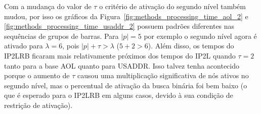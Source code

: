 Com a mudança do valor de $\tau$ o critério de ativação do segundo nível também mudou, por isso os gráficos da Figura~\ref{fig:methods_processing_time_aol_2} e \ref{fig:methods_processing_time_usaddr_2} possuem padrões diferentes nas sequências de grupos de barras. Para $|p|=5$ por exemplo o segundo nível agora é ativado para $\lambda=6$, pois $|p| + \tau > \lambda$ ($5 + 2 > 6$). Além disso, os tempos do IP2LRB ficaram mais relativamente próximos dos tempos do IP2L quando $\tau=2$ tanto para a base AOL quanto para USADDR. Isso talvez tenha acontecido porque o aumento de $\tau$ causou uma multiplicação significativa de nós ativos no segundo nível, mas o percentual de ativação da busca binária foi bem baixo (o que é esperado para o IP2LRB em alguns casos, devido à sua condição de restrição de ativação). 

